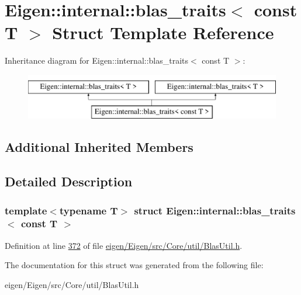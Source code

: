 \hypertarget{struct_eigen_1_1internal_1_1blas__traits_3_01const_01_t_01_4}{}\section{Eigen\+:\+:internal\+:\+:blas\+\_\+traits$<$ const T $>$ Struct Template Reference}
\label{struct_eigen_1_1internal_1_1blas__traits_3_01const_01_t_01_4}
Inheritance diagram for Eigen\+:\+:internal\+:\+:blas\+\_\+traits$<$ const T $>$\+:\begin{figure}[H]
\begin{center}
\leavevmode
\includegraphics[height=2.000000cm]{struct_eigen_1_1internal_1_1blas__traits_3_01const_01_t_01_4}
\end{center}
\end{figure}
\subsection*{Additional Inherited Members}


\subsection{Detailed Description}
\subsubsection*{template$<$typename T$>$\newline
struct Eigen\+::internal\+::blas\+\_\+traits$<$ const T $>$}



Definition at line \hyperlink{eigen_2_eigen_2src_2_core_2util_2_blas_util_8h_source_l00372}{372} of file \hyperlink{eigen_2_eigen_2src_2_core_2util_2_blas_util_8h_source}{eigen/\+Eigen/src/\+Core/util/\+Blas\+Util.\+h}.



The documentation for this struct was generated from the following file\+:\begin{DoxyCompactItemize}
\item 
eigen/\+Eigen/src/\+Core/util/\+Blas\+Util.\+h\end{DoxyCompactItemize}
